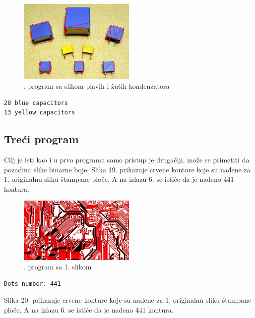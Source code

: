 \documentclass[fontsize=12bp, paper=a4]{scrarticle}
\begin{document}
\begin{figure}[h!]
    \centering
    \includegraphics[width=0.5\textwidth]{21.png}
    \caption{. program sa slikom plavih i žutih kondenzatora}
\end{figure} 

\begin{lstlisting}[caption=2. program sa slikom plavih i žutih kondenzatora]
28 blue capacitors
13 yellow capacitors
\end{lstlisting}

\subsection*{Treći program}

Cilj je isti kao i u prvo programu samo pristup je drugačiji, može se primetiti da pozadina slike binarne boje. Slika 19. prikazuje crvene konture koje su nađene za 1. originalnu sliku štampane ploče. A na izlazu 6. se ističe da je nađeno 441 kontura.

\begin{figure}[h!]
    \centering
    \includegraphics[width=0.5\textwidth]{31.png}
    \caption{. program sa 1. slikom}
\end{figure} 

\begin{lstlisting}[caption=3. program sa 1. slikom]
Dots number: 441
\end{lstlisting}

Slika 20. prikazuje crvene konture koje su nađene za 1. originalnu sliku štampane ploče. A na izlazu 6. se ističe da je nađeno 441 kontura.
\end{document}
